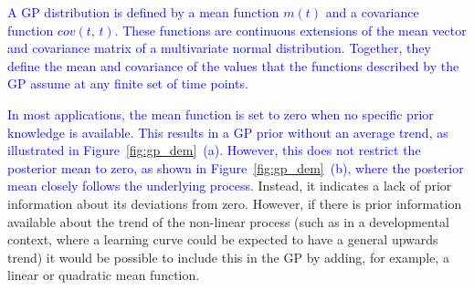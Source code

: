 \documentclass[man, floatsintext]{apa7}
\begin{document}
\begin{sidewaysfigure*}[htbp]
  \caption{Demonstration of a Gaussian process regression}
  \label{fig:gp_dem}
\end{sidewaysfigure*}

\textcolor{blue}{
  A GP distribution is defined by a mean function $m(t)$ and a covariance
  function $cov(t, \, t)$. These functions are continuous extensions of the
  mean vector and covariance matrix of a multivariate normal distribution.
  Together, they define the mean and covariance of the values that the
  functions described by the GP assume at any finite set of time points.
}

\textcolor{blue}{
  In most applications, the mean function is set to zero when no specific prior
  knowledge is available. This results in a GP prior without an average trend,
  as illustrated in Figure~\ref{fig:gp_dem}~(a). However, this does not
  restrict the posterior mean to zero, as shown in Figure~\ref{fig:gp_dem}~(b),
  where the posterior mean closely follows the underlying process. } Instead,
it indicates a lack of prior information about its deviations from zero.
However, if there is prior information available about the trend of the
non-linear process (such as in a developmental context, where a learning
curve could be expected to have a general upwards trend) it would be possible
to include this in the GP by adding, for example, a linear or quadratic mean
function.
\end{document}

